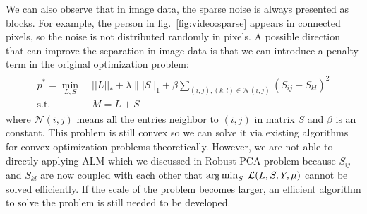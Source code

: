 We can also observe that in image data, the sparse noise is always presented as blocks. For example, the person in fig.~\ref{fig:video:sparse} appears in connected pixels, so the noise is not distributed randomly in pixels. A possible direction that can improve the separation in image data is that we can introduce a penalty term in the original optimization problem:
\begin{align}
\begin{split}
p^* = \min_{L,S} \; &||L||_{*} + \lambda \||S||_{1} + \beta\sum_{(i, j), (k, l)\in\mathcal{N}(i, j)}^{} (S_{ij} - S_{kl})^2\\
\text{s.t.} \quad &M = L+S
\end{split}
\label{applications:discussion}
\end{align}
where $\mathcal{N}(i,j)$ means all the entries neighbor to $(i,j)$ in matrix $S$ and $\beta$ is an constant. This problem is still convex so we can solve it via existing algorithms for convex optimization problems theoretically. However, we are not able to directly applying ALM which we discussed in Robust PCA problem because $S_{ij}$ and $S_{kl}$ are now coupled with each other that $\operatorname*{arg\,min}_{S} \; {\mathcal{L}}(L,S,Y,\mu)$ cannot be solved efficiently. If the scale of the problem becomes larger, an efficient algorithm to solve the problem is still needed to be developed. 